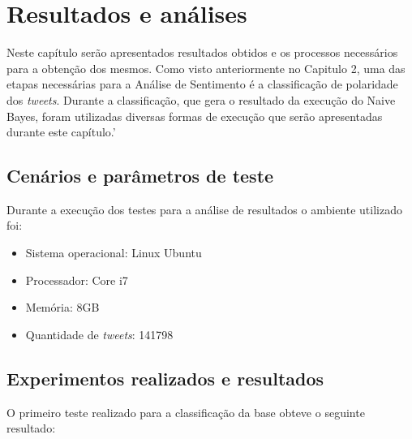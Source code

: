 \chapter{Resultados e análises}\label{cap:resultados}

Neste capítulo serão apresentados resultados obtidos e os processos necessários para a obtenção dos mesmos. Como visto anteriormente no Capitulo 2,  uma das etapas
necessárias para a Análise de Sentimento é a classificação de polaridade dos \textit{tweets}. Durante a classificação, que gera o resultado da execução do Naive Bayes, foram utilizadas diversas formas de execução que serão apresentadas durante este capítulo.'

\section{Cenários e parâmetros de teste}\label{sec:cenarios}
Durante a execução dos testes para a análise de resultados o ambiente utilizado foi:
\begin{itemize}
	\item Sistema operacional: Linux Ubuntu
	\item Processador: Core i7
	\item Memória: 8GB
	\item Quantidade de \textit{tweets}: 141798
\end{itemize}


\section{Experimentos realizados e resultados}\label{sec:resultados}
O primeiro teste realizado para a classificação da base obteve o seguinte resultado:
\begin{table}[]
	\caption{1º teste}
	\label{teste-1}
\end{table}

